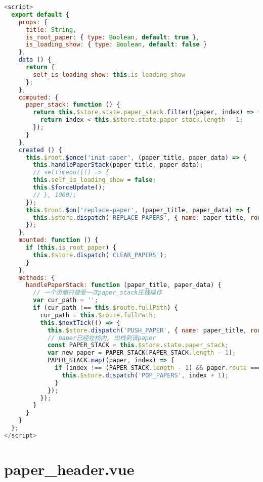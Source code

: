 \begin{lstlisting}[language=JavaScript]
<script>
  export default {
    props: {
      title: String,
      is_root_paper: { type: Boolean, default: true },
      is_loading_show: { type: Boolean, default: false }
    },
    data () {
      return {
        self_is_loading_show: this.is_loading_show
      };
    },
    computed: {
      paper_stack: function () {
        return this.$store.state.paper_stack.filter((paper, index) => {
          return index < this.$store.state.paper_stack.length - 1;
        });
      }
    },
    created () {
      this.$root.$once('init-paper', (paper_title, paper_data) => {
        this.handlePaperStack(paper_title, paper_data);
        // setTimeout(() => {
        this.self_is_loading_show = false;
        this.$forceUpdate();
        // }, 1000);
      });
      this.$root.$on('replace-paper', (paper_title, paper_data) => {
        this.$store.dispatch('REPLACE_PAPERS', { name: paper_title, route: this.$route.fullPath, data: paper_data });
      });
    },
    mounted: function () {
      if (this.is_root_paper) {
        this.$store.dispatch('CLEAR_PAPERS');
      }
    },
    methods: {
      handlePaperStack: function (paper_title, paper_data) {
        // 一个页面只接受一次paper_stack压栈操作
        var cur_path = '';
        if (cur_path !== this.$route.fullPath) {
          cur_path = this.$route.fullPath;
          this.$nextTick(() => {
            this.$store.dispatch('PUSH_PAPER', { name: paper_title, route: cur_path, data: paper_data });
            // paper已经在栈内, 出栈到该paper
            const PAPER_STACK = this.$store.state.paper_stack;
            var new_paper = PAPER_STACK[PAPER_STACK.length - 1];
            PAPER_STACK.map((paper, index) => {
              if (index !== (PAPER_STACK.length - 1) && paper.route === new_paper.route) {
                this.$store.dispatch('POP_PAPERS', index + 1);
              }
            });
          });
        }
      }
    }
  };
</script>

\end{lstlisting}

\section{paper\_header.vue}



